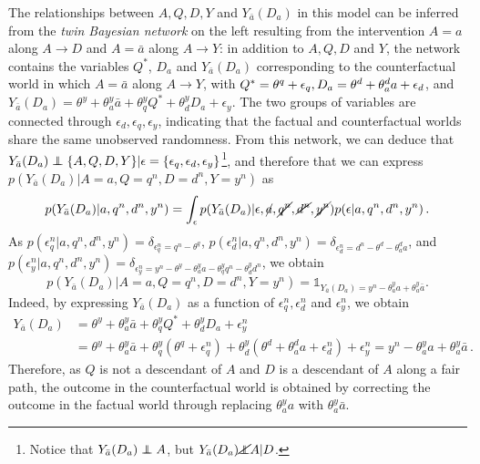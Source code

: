 \documentclass[runningheads]{llncs}
\newcommand\independent{\protect\mathpalette{\protect\independenT}{\perp}}
\def\independenT#1#2{\mathrel{\rlap{$#1#2$}\mkern2mu{#1#2}}}
\begin{document}
\noindent The relationships between $A,Q,D,Y$ and $Y_{\bar a}(D_a)$ in this model can be inferred from the \emph{twin Bayesian network} \cite{pearl00causality} on the left resulting from the intervention $A=a$ along $A\rightarrow D$ and $A=\bar a$ along $A\rightarrow Y$: in addition to $A,Q,D$ and $Y$, the network contains the variables $Q^*$, $D_a$ and $Y_{\bar a}(D_a)$ corresponding to the counterfactual world in which $A=\bar a$ along $A\rightarrow Y$, with  $Q^*=\theta^q+\epsilon_q, \hskip0.0cm D_a=\theta^d+\theta^d_{a}a+\epsilon_d$, and $Y_{\bar a}(D_a)=\theta^y+\theta^y_a\bar a+\theta^y_{q}Q^*+\theta^y_{d}D_a +\epsilon_y$. The two groups of variables are connected through $\epsilon_d, \epsilon_q, \epsilon_y$, indicating that the factual and counterfactual worlds share the same unobserved randomness. From this network, we can deduce that $Y_{\bar a}(D_a)\independent \{A,Q,D,Y\}|\epsilon=\{\epsilon_q,\epsilon_d, \epsilon_y\}$\footnote{Notice that $Y_{\bar a}(D_a)\independent A$, but $Y_{\bar a}(D_a)\cancel{\independent} A|D$.}, and therefore that we can express $p(Y_{\bar a}(D_a)|A=a, Q=q^n, D=d^n, Y=y^n)$ as
\begin{align}
p(Y_{\bar a}(D_a)|a,q^n, d^n,y^n) 
= \int_{\epsilon} p(Y_{\bar a}(D_a)| \epsilon, \cancel{a}, \cancel{q^n}, \cancel{d^n}, \cancel{y^n})p(\epsilon|a, q^n, d^n, y^n)\,.
\label{eq:counterf}
\end{align}
As $p(\epsilon^n_q|a, q^n, d^n, y^n)=\delta_{\epsilon^n_q=q^n-\theta^q}$, $p(\epsilon^n_d|a, q^n, d^n, y^n)=\delta_{\epsilon^n_d=d^n-\theta^d-\theta^d_aa}$, and $p(\epsilon^n_y|a, q^n, d^n, y^n) = \delta_{\epsilon^n_y=y^n-\theta^y-\theta^y_aa-\theta^y_qq^n-\theta^y_dd^n}$, we obtain $$p(Y_{\bar a}(D_a)|A=a, Q=q^n, D=d^n, Y=y^n)=\mathbb{1}_{Y_{\bar a}(D_a)=y^n-\theta^y_aa+\theta^y_a\bar a}.$$
Indeed, by expressing $Y_{\bar a}(D_a)$ as a function of $\epsilon^n_q, \epsilon^n_d$ and $\epsilon^n_y$, we obtain
\begin{align*}
Y_{\bar a}(D_a)&=\theta^y+\theta^y_a\bar a+\theta^y_{q}Q^*+\theta^y_{d}D_a+\epsilon^n_y\\
& =\theta^y+\theta^y_a\bar a+\theta^y_{q}(\theta^q+\epsilon^n_q)+\theta^y_{d}(\theta^d+\theta^d_{a}a+\epsilon^n_d)+\epsilon^n_y=y^n-\theta^y_aa+\theta^y_a\bar a\,.
\end{align*}
Therefore, as $Q$ is not a descendant of $A$ and $D$ is a descendant of $A$ along a fair path, the outcome in the counterfactual world is obtained by correcting the outcome in the factual world through replacing $\theta^y_aa$ with $\theta^y_a\bar a$. 
\end{document}
